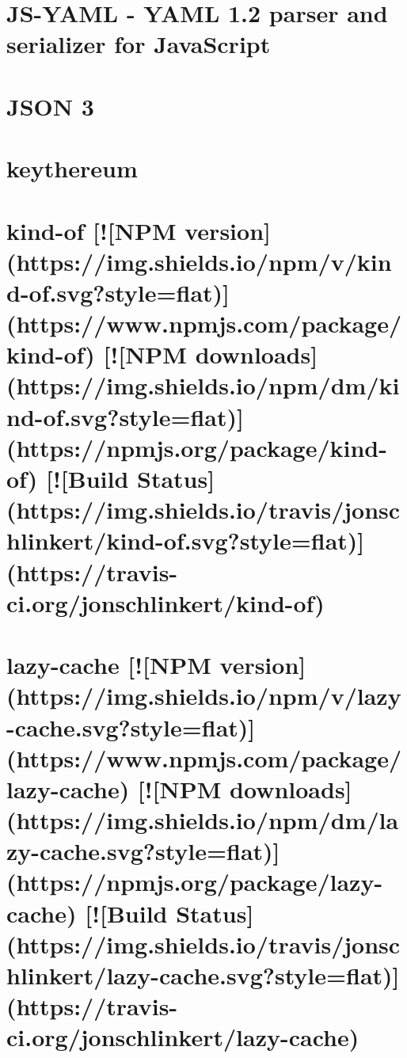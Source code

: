 \documentclass[twoside]{book}
\newcommand{\+}{\discretionary{\mbox{\scriptsize$\hookleftarrow$}}{}{}}
\begin{document}
\chapter{J\+S-\/\+Y\+A\+ML -\/ Y\+A\+ML 1.2 parser and serializer for Java\+Script}
\label{md_app_web_node_modules_js-yaml__r_e_a_d_m_e}

\chapter{J\+S\+ON 3}
\label{md_app_web_node_modules_json3__r_e_a_d_m_e}

\chapter{keythereum}
\label{md_app_web_node_modules_keythereum__r_e_a_d_m_e}

\chapter{kind-\/of \mbox{[}!\mbox{[}N\+PM version\mbox{]}(https\+://img.shields.\+io/npm/v/kind-\/of.svg?style=flat)\mbox{]}(https\+://www.npmjs.\+com/package/kind-\/of) \mbox{[}!\mbox{[}N\+PM downloads\mbox{]}(https\+://img.shields.\+io/npm/dm/kind-\/of.svg?style=flat)\mbox{]}(https\+://npmjs.org/package/kind-\/of) \mbox{[}!\mbox{[}Build Status\mbox{]}(https\+://img.shields.\+io/travis/jonschlinkert/kind-\/of.svg?style=flat)\mbox{]}(https\+://travis-\/ci.org/jonschlinkert/kind-\/of)}
\label{md_app_web_node_modules_kind-of__r_e_a_d_m_e}

\chapter{lazy-\/cache \mbox{[}!\mbox{[}N\+PM version\mbox{]}(https\+://img.shields.\+io/npm/v/lazy-\/cache.svg?style=flat)\mbox{]}(https\+://www.npmjs.\+com/package/lazy-\/cache) \mbox{[}!\mbox{[}N\+PM downloads\mbox{]}(https\+://img.shields.\+io/npm/dm/lazy-\/cache.svg?style=flat)\mbox{]}(https\+://npmjs.org/package/lazy-\/cache) \mbox{[}!\mbox{[}Build Status\mbox{]}(https\+://img.shields.\+io/travis/jonschlinkert/lazy-\/cache.svg?style=flat)\mbox{]}(https\+://travis-\/ci.org/jonschlinkert/lazy-\/cache)}
\label{md_app_web_node_modules_lazy-cache__r_e_a_d_m_e}

\end{document}
